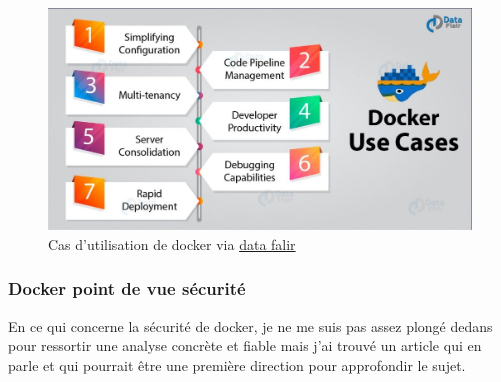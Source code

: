 \documentclass[
    iai, %
    il, %
]{heig-tb}
\begin{document}
\begin{center}
    \begin{figure}
        \includegraphics[width=\textwidth]{./assets/figures/docker-use-cases.jpg}
        \caption[Cas d'utilisation de docker]{Cas d'utilisation de docker via \href{https://data-flair.training/blogs/wp-content/uploads/sites/2/2018/10/}{data falir}
            \label{docker-use-cases}}
    \end{figure}
\end{center}

\subsubsection{Docker point de vue sécurité}
En ce qui concerne la sécurité de \Gls{docker}, je ne me suis pas assez plongé dedans pour ressortir une
analyse concrète et fiable mais j'ai trouvé un article \cite{combe} qui en parle et qui pourrait
être une première direction pour approfondir le sujet.



\end{document}
